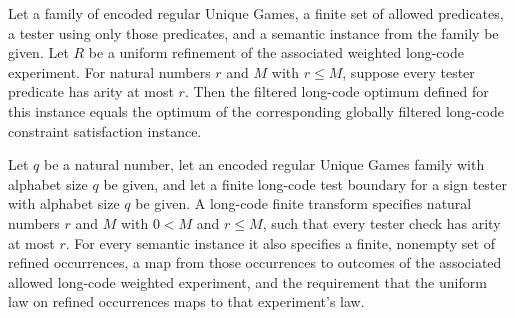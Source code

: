 \begin{theorem}
\label{FABL.EncodedRegularUniqueGamesFamily.filteredLongCodeOptimum_eq}
\leanok
{}
Let a family of encoded regular Unique Games, a finite set of allowed predicates, a
tester using only those predicates, and a semantic instance from the family be given.
Let $R$ be a uniform refinement of the associated weighted long-code experiment. For
natural numbers $r$ and $M$ with $r\le M$, suppose every tester predicate has arity at
most $r$. Then the filtered long-code optimum defined for this instance equals the
optimum of the corresponding globally filtered long-code constraint satisfaction
instance.
\end{theorem}

\begin{definition}
\label{FABL.EncodedRegularUniqueGamesFamily.LongCodeFiniteTransform}
\leanok
{}
Let $q$ be a natural number, let an encoded regular Unique Games family with alphabet
size $q$ be given, and let a finite long-code test boundary for a sign tester with
alphabet size $q$ be given. A long-code finite transform specifies natural numbers $r$
and $M$ with $0<M$ and $r\le M$, such that every tester check has arity at most $r$. For
every semantic instance it also specifies a finite, nonempty set of refined occurrences,
a map from those occurrences to outcomes of the associated allowed long-code weighted
experiment, and the requirement that the uniform law on refined occurrences maps to that
experiment's law.
\end{definition}

